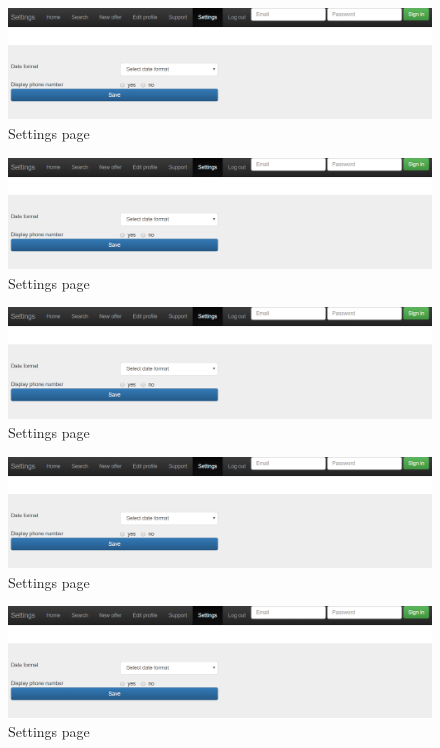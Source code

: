 \documentclass[11pt,twoside,a4paper]{report}
\begin{document}
\begin{figure}
	\centering
	\includegraphics[width=\textwidth]{png/webapp-settings.png}
	\caption{Settings page}
	\label{figure:settings-page}
\end{figure}

\begin{figure}
	\centering
	\includegraphics[width=\textwidth]{png/webapp-settings.png}
	\caption{Settings page}
	\label{figure:settings-page}
\end{figure}

\begin{figure}
	\centering
	\includegraphics[width=\textwidth]{png/webapp-settings.png}
	\caption{Settings page}
	\label{figure:settings-page}
\end{figure}
\begin{figure}
	\centering
	\includegraphics[width=\textwidth]{png/webapp-settings.png}
	\caption{Settings page}
	\label{figure:settings-page}
\end{figure}
\begin{figure}
	\centering
	\includegraphics[width=\textwidth]{png/webapp-settings.png}
	\caption{Settings page}
	\label{figure:settings-page}
\end{figure}
\end{document}
